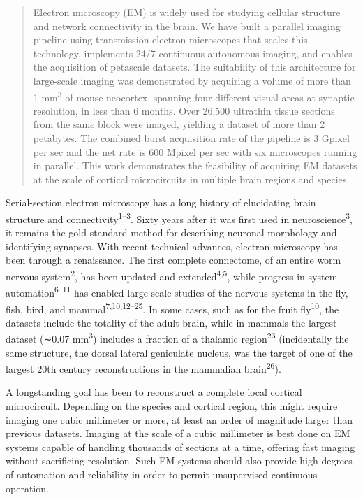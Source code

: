 \documentclass{article}
\begin{document}
\begin{quote}
Electron microscopy (EM) is widely used for studying cellular structure and network connectivity in the brain. We have built a parallel imaging pipeline using transmission electron microscopes that scales this technology, implements 24/7 continuous autonomous imaging, and enables the acquisition of petascale datasets. The suitability of this architecture for large-scale imaging was demonstrated by acquiring a volume of more than 1 mm\textsuperscript{3} of mouse neocortex, spanning four different visual areas at synaptic resolution, in less than 6 months. Over 26,500 ultrathin tissue sections from the same block were imaged, yielding a dataset of more than 2 petabytes. The combined burst acquisition rate of the pipeline is 3 Gpixel per sec and the net rate is 600 Mpixel per sec with six microscopes running in parallel. This work demonstrates the feasibility of acquiring EM datasets at the scale of cortical microcircuits in multiple brain regions and species.
\end{quote}

Serial-section electron microscopy has a long history of elucidating brain structure and connectivity\textsuperscript{1–3}. Sixty years after it was first used in neuroscience\textsuperscript{3}, it remains the gold standard method for describing neuronal morphology and identifying synapses. With recent technical advances, electron microscopy has been through a renaissance. The first complete connectome, of an entire worm nervous system\textsuperscript{2}, has been updated and extended\textsuperscript{4,5}, while progress in system automation\textsuperscript{6–11} has enabled large scale studies of the nervous systems in the fly, fish, bird, and mammal\textsuperscript{7,10,12–25}. In some cases, such as for the fruit fly\textsuperscript{10}, the datasets include the totality of the adult brain, while in mammals the largest dataset (∼0.07 mm\textsuperscript{3}) includes a fraction of a thalamic region\textsuperscript{23} (incidentally the same structure, the dorsal lateral geniculate nucleus, was the target of one of the largest 20th century reconstructions in the mammalian brain\textsuperscript{26}).

A longstanding goal has been to reconstruct a complete local cortical microcircuit. Depending on the species and cortical region, this might require imaging one cubic millimeter or more, at least an order of magnitude larger than previous datasets. Imaging at the scale of a cubic millimeter is best done on EM systems capable of handling thousands of sections at a time, offering fast imaging without sacrificing resolution. Such EM systems should also provide high degrees of automation and reliability in order to permit unsupervised continuous operation.
\end{document}
